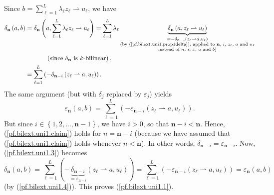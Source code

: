 \documentclass[etingof-lie.tex]{subfiles}
\begin{document}
\begin{noncompile}
\begin{verlong}
Since $b=\sum\limits_{\ell=1}^{L}\lambda_{\ell}z_{\ell}\rightharpoonup
u_{\ell}$, we have
\begin{align}
\delta_{\mathbf{n}}\left(  a,b\right)   &  =\delta_{\mathbf{n}}\left(
a,\sum\limits_{\ell=1}^{L}\lambda_{\ell}z_{\ell}\rightharpoonup u_{\ell
}\right)  =\sum\limits_{\ell=1}^{L}\lambda_{\ell}\underbrace{\delta
_{\mathbf{n}}\left(  a,z_{\ell}\rightharpoonup u_{\ell}\right)  }%
_{\substack{=-\delta_{\mathbf{n}-i}\left(  z_{\ell}\rightharpoonup a,u_{\ell
}\right)  \\\text{(by (\ref{pf.bilext.uni1.prop1delta}), applied to
}\mathbf{n}\text{, }i\text{, }z_{\ell}\text{, }a\text{ and }u_{\ell
}\\\text{instead of }n\text{, }i\text{, }x\text{, }a\text{ and }b\text{)}%
}}\nonumber\\
&  \ \ \ \ \ \ \ \ \ \ \left(  \text{since }\delta_{\mathbf{n}}\text{ is
}k\text{-bilinear}\right)  .\nonumber\\
&  =\sum\limits_{\ell=1}^{L}\left(  -\delta_{\mathbf{n}-i}\left(  z_{\ell
}\rightharpoonup a,u_{\ell}\right)  \right)  . \label{pf.bilext.uni1.3}%
\end{align}
The same argument (but with $\delta_{j}$ replaced by $\varepsilon_{j}$) yields%
\begin{equation}
\varepsilon_{\mathbf{n}}\left(  a,b\right)  =\sum\limits_{\ell=1}^{L}\left(
-\varepsilon_{\mathbf{n}-i}\left(  z_{\ell}\rightharpoonup a,u_{\ell}\right)
\right)  . \label{pf.bilext.uni1.4}%
\end{equation}
But since $i\in\left\{  1,2,...,\mathbf{n}-1\right\}  $, we have $i>0$, so
that $\mathbf{n}-i<\mathbf{n}$. Hence, (\ref{pf.bilext.uni1.claim}) holds for
$n=\mathbf{n}-i$ (because we have assumed that (\ref{pf.bilext.uni1.claim})
holds whenever $n<\mathbf{n}$). In other words, $\delta_{\mathbf{n}%
-i}=\varepsilon_{\mathbf{n}-i}$. Now, (\ref{pf.bilext.uni1.3}) becomes%
\[
\delta_{\mathbf{n}}\left(  a,b\right)  =\sum\limits_{\ell=1}^{L}\left(
-\underbrace{\delta_{\mathbf{n}-i}}_{=\varepsilon_{\mathbf{n}-i}}\left(
z_{\ell}\rightharpoonup a,u_{\ell}\right)  \right)  =\sum\limits_{\ell=1}%
^{L}\left(  -\varepsilon_{\mathbf{n}-i}\left(  z_{\ell}\rightharpoonup
a,u_{\ell}\right)  \right)  =\varepsilon_{\mathbf{n}}\left(  a,b\right)
\]
(by (\ref{pf.bilext.uni1.4})). This proves (\ref{pf.bilext.uni1.1}).


\end{verlong}
\end{noncompile}
\end{document}
